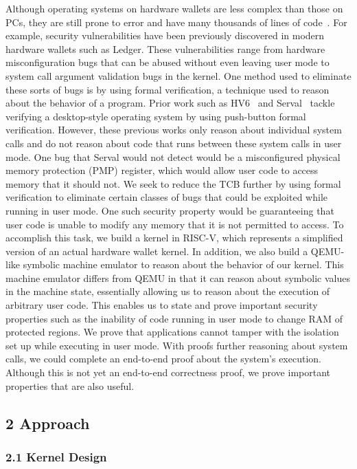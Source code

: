 \documentclass[]{article}
\begin{document}
Although operating systems on hardware wallets are less complex than those on PCs, they are still prone to error and have many thousands of lines of code~\cite{software-attacks}. For example, security vulnerabilities have been previously discovered in modern hardware wallets such as Ledger. These vulnerabilities range from hardware misconfiguration bugs that can be abused without even leaving user mode to system call argument validation bugs in the kernel. One method used to eliminate these sorts of bugs is by using formal verification, a technique used to reason about the behavior of a program. Prior work such as HV6~\cite{10.1145/3132747.3132748} and Serval~\cite{10.1145/3341301.3359641} tackle verifying a desktop-style operating system by using push-button formal verification. However, these previous works only reason about individual system calls and do not reason about code that runs between these system calls in user mode. One bug that Serval would not detect would be a misconfigured physical memory protection (PMP) register, which would allow user code to access memory that it should not. We seek to reduce the TCB further by using formal verification to eliminate certain classes of bugs that could be exploited while running in user mode. One such security property would be guaranteeing that user code is unable to modify any memory that it is not permitted to access. To accomplish this task, we build a kernel in RISC-V, which represents a simplified version of an actual hardware wallet kernel. In addition, we also build a QEMU-like symbolic machine emulator to reason about the behavior of our kernel. This machine emulator differs from QEMU in that it can reason about symbolic values in the machine state, essentially allowing us to reason about the execution of arbitrary user code. This enables us to state and prove important security properties such as the inability of code running in user mode to change RAM of protected regions. We prove that applications cannot tamper with the isolation set up while executing in user mode. With proofs further reasoning about system calls, we could complete an end-to-end proof about the system's execution. Although this is not yet an end-to-end correctness proof, we prove important properties that are also useful.

\subsection{2 Approach}\label{approach}

\subsubsection{2.1 Kernel Design}\label{kernel-design}
\end{document}
